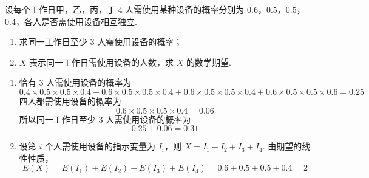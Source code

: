 \begin{problem}
设每个工作日甲，乙，丙，丁 \(4\) 人需使用某种设备的概率分别为 \(0.6\)，\(0.5\)，\(0.5\)，\(0.4\)，各人是否需使用设备相互独立.

\begin{enumerate}
\item 求同一工作日至少 \(3\) 人需使用设备的概率；
\item \(X\) 表示同一工作日需使用设备的人数，求 \(X\) 的数学期望.
\end{enumerate}
\begin{solution}
\begin{enumerate}
\item 恰有 \(3\) 人需使用设备的概率为
\[
0.4\times0.5\times0.5\times0.4
+0.6\times0.5\times0.5\times0.4
+0.6\times0.5\times0.5\times0.4
+0.6\times0.5\times0.5\times0.6=0.25
\]
四人都需使用设备的概率为
\[
0.6\times0.5\times0.5\times0.4=0.06
\]
所以同一工作日至少 \(3\) 人需使用设备的概率为
\[
0.25+0.06=0.31
\]
\item 设第 \(i\) 个人需使用设备的指示变量为 \(I_{i}\)，则
\(X=I_{1}+I_{2}+I_{3}+I_{4}\). 由期望的线性性质，
\[
E(X)=E(I_{1})+E(I_{2})+E(I_{3})+E(I_{4})
=0.6+0.5+0.5+0.4=2
\]
\end{enumerate}
\end{solution}
\end{problem}

